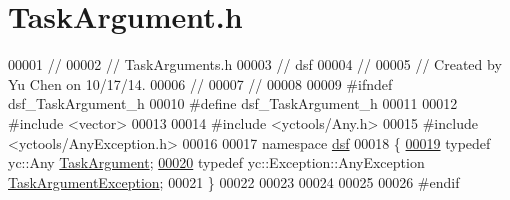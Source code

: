 \hypertarget{_task_argument_8h_source}{}\section{Task\+Argument.\+h}
\label{_task_argument_8h_source}

\begin{DoxyCode}
00001 \textcolor{comment}{//}
00002 \textcolor{comment}{//  TaskArguments.h}
00003 \textcolor{comment}{//  dsf}
00004 \textcolor{comment}{//}
00005 \textcolor{comment}{//  Created by Yu Chen on 10/17/14.}
00006 \textcolor{comment}{//}
00007 \textcolor{comment}{//}
00008 
00009 \textcolor{preprocessor}{#ifndef dsf\_TaskArgument\_h}
00010 \textcolor{preprocessor}{#define dsf\_TaskArgument\_h}
00011 
00012 \textcolor{preprocessor}{#include <vector>}
00013 
00014 \textcolor{preprocessor}{#include <yctools/Any.h>}
00015 \textcolor{preprocessor}{#include <yctools/AnyException.h>}
00016 
00017 \textcolor{keyword}{namespace }\hyperlink{namespacedsf}{dsf}
00018 \{
\hypertarget{_task_argument_8h_source_l00019}{}\hyperlink{namespacedsf_abe4bf68433935a81c31a5ada9b17663a}{00019}     \textcolor{keyword}{typedef} yc::Any \hyperlink{namespacedsf_abe4bf68433935a81c31a5ada9b17663a}{TaskArgument};
\hypertarget{_task_argument_8h_source_l00020}{}\hyperlink{namespacedsf_af54027177bbfc0037be408a612d48b83}{00020}     \textcolor{keyword}{typedef} yc::Exception::AnyException \hyperlink{namespacedsf_af54027177bbfc0037be408a612d48b83}{TaskArgumentException};
00021 \}
00022 
00023 
00024 
00025 
00026 \textcolor{preprocessor}{#endif}
\end{DoxyCode}
